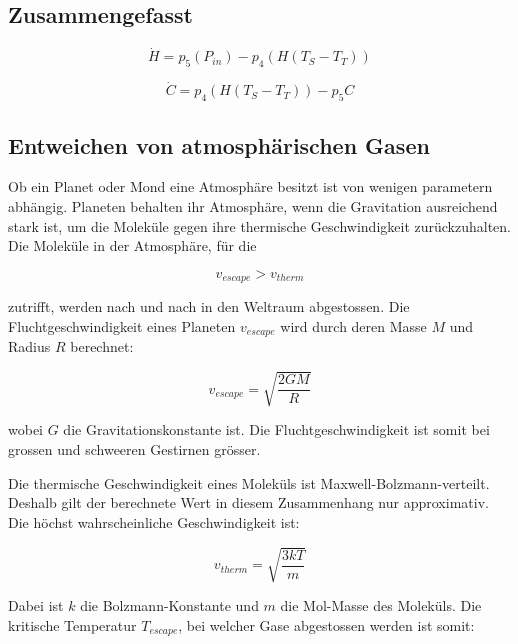 \begin{refsection}
\subsection{Zusammengefasst}


\begin{equation}
\dot{H} = p_5 (P_{in}) - p_4 \left( H(T_S - T_T) \right)
\end{equation}

\begin{equation}
\dot{C} = p_4 \left( H(T_S - T_T) \right) - p_5 C
\end{equation}


\subsection{Entweichen von atmosphärischen Gasen}

Ob ein Planet oder Mond eine Atmosphäre besitzt ist von wenigen parametern abhängig. Planeten behalten ihr Atmosphäre, wenn die Gravitation ausreichend stark ist, um die Moleküle gegen ihre thermische Geschwindigkeit zurückzuhalten.
Die Moleküle in der Atmosphäre, für die


\begin{equation}
v_{escape} > v_{therm}
\end{equation}

zutrifft, werden nach und nach in den Weltraum abgestossen.
Die Fluchtgeschwindigkeit eines Planeten $v_{escape}$ wird durch deren Masse $M$ und Radius $R$ berechnet: 

\begin{equation}
v_{escape} = \sqrt{\frac{2GM}{R}}
\end{equation}

wobei $G$ die Gravitationskonstante ist. Die Fluchtgeschwindigkeit ist somit bei grossen und schweeren Gestirnen grösser.

Die thermische Geschwindigkeit eines Moleküls ist Maxwell-Bolzmann-verteilt. Deshalb gilt der berechnete Wert in diesem Zusammenhang nur approximativ. Die höchst wahrscheinliche Geschwindigkeit ist: 

\begin{equation}
v_{therm} = \sqrt{\frac{3kT}{m}}
\end{equation}

Dabei ist $k$ die Bolzmann-Konstante und $m$ die Mol-Masse des Moleküls. Die kritische Temperatur $T_{escape}$, bei welcher Gase abgestossen werden ist somit:


\end{refsection}
